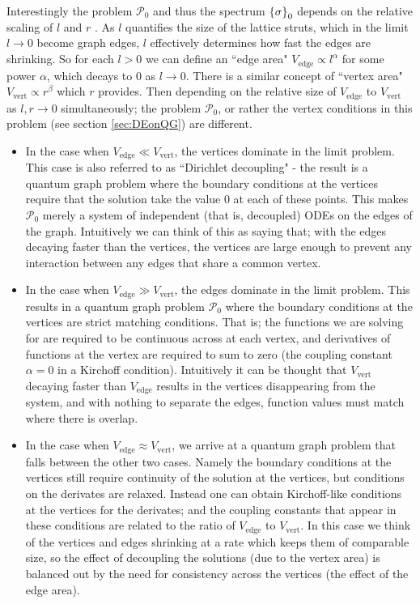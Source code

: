 Interestingly the problem $\mathcal{P}_0$ and thus the spectrum $\left\{ \sigma \right\}_0$ depends on the relative scaling of $l$ and $r$ \cite{exner2005convergence} .
As $l$ quantifies the size of the lattice struts, which in the limit $l\rightarrow0$ become graph edges, $l$ effectively determines how fast the edges are shrinking.
So for each $l>0$ we can define an ``edge area" $V_{\mathrm{edge}} \propto l^{\alpha}$ for some power $\alpha$, which decays to 0 as $l\rightarrow0$.
There is a similar concept of ``vertex area" $V_{\mathrm{vert}} \propto r^{\beta}$ which $r$ provides.
Then depending on the relative size of $V_{\mathrm{edge}}$ to $V_{\mathrm{vert}}$ as $l,r\rightarrow0$ simultaneously; the problem $\mathcal{P}_0$, or rather the vertex conditions in this problem (see section \ref{sec:DEonQG}) are different.
\begin{itemize}
	\item In the case when $V_{\mathrm{edge}} \ll V_{\mathrm{vert}}$, the vertices dominate in the limit problem.
	This case is also referred to as ``Dirichlet decoupling" - the result is a quantum graph problem where the boundary conditions at the vertices require that the solution take the value 0 at each of these points.
	This makes $\mathcal{P}_0$ merely a system of independent (that is, decoupled) ODEs on the edges of the graph.
	Intuitively we can think of this as saying that; with the edges decaying faster than the vertices, the vertices are large enough to prevent any interaction between any edges that share a common vertex.
	\item In the case when $V_{\mathrm{edge}} \gg V_{\mathrm{vert}}$, the edges dominate in the limit problem.
	This results in a quantum graph problem $\mathcal{P}_0$ where the boundary conditions at the vertices  are strict matching conditions.
	That is; the functions we are solving for are required to be continuous across at each vertex, and derivatives of functions at the vertex are required to sum to zero (the coupling constant $\alpha=0$ in a Kirchoff condition).
	Intuitively it can be thought that $V_{\mathrm{vert}}$ decaying faster than $V_{\mathrm{edge}}$ results in the vertices disappearing from the system, and with nothing to separate the edges, function values must match where there is overlap.
	\item In the case when $V_{\mathrm{edge}} \approx V_{\mathrm{vert}}$, we arrive at a quantum graph problem that falls between the other two cases.
	Namely the boundary conditions at the vertices still require continuity of the solution at the vertices, but conditions on the derivates are relaxed.
	Instead one can obtain Kirchoff-like conditions at the vertices for the derivates; and the coupling constants that appear in these conditions are related to the ratio of $V_{\mathrm{edge}}$ to $V_{\mathrm{vert}}$.
	In this case we think of the vertices and edges shrinking at a rate which keeps them of comparable size, so the effect of decoupling the solutions (due to the vertex area) is balanced out by the need for consistency across the vertices (the effect of the edge area).
\end{itemize}

